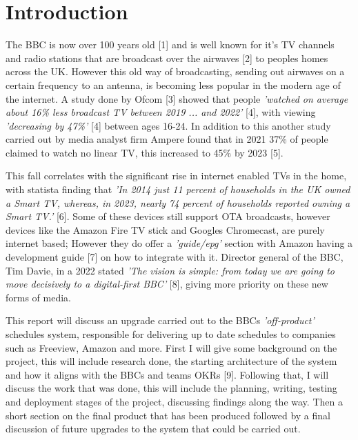 \section{Introduction}

  The BBC is now over 100 years old [1] and is well known for it's TV channels and radio stations that are broadcast over the airwaves [2] 
  to peoples homes across the UK. However this old way of broadcasting, sending out airwaves on a certain frequency to an antenna, is becoming 
  less popular in the modern age of the internet. A study done by Ofcom [3] showed that people
  \textit{'watched on average about 16\% less broadcast TV between 2019 ... and 2022'} [4], with viewing \textit{'decreasing by 47\%'} [4] between ages
  16-24. In addition to this another study carried out by media analyst firm Ampere found that in 2021 37\% of people claimed to watch no linear TV,
  this increased to 45\% by 2023 [5].
  
  This fall correlates with the significant rise in internet enabled TVs in the home, with statista finding that 
  \textit{'In 2014 just 11 percent of households in the UK owned a Smart TV, whereas, in 2023, nearly 74 percent of households reported owning a Smart TV.'} [6].
  Some of these devices still support OTA broadcasts, however devices like the Amazon Fire TV stick and Googles Chromecast, are purely internet
  based; However they do offer a \textit{'guide/epg'} section with Amazon having a development guide [7] on how to integrate with it.
  Director general of the BBC, Tim Davie, in a 2022 stated \textit{'The vision is simple: from today we are going to move decisively to 
  a digital-first BBC'} [8], giving more priority on these new forms of media. 
  
  This report will discuss an upgrade carried out to the BBCs \textit{'off-product'} schedules system, responsible for delivering up to date schedules to
  companies such as Freeview, Amazon and more. First I will give some background on the project, this will include research done, the starting
  architecture of the system and how it aligns with the BBCs and teams OKRs [9]. Following that, I will discuss the work that was done, this will 
  include the planning, writing, testing and deployment stages of the project, discussing findings along the way. Then a short section on the final product 
  that has been produced followed by a final discussion of future upgrades to the system that could be carried out.

\newpage
